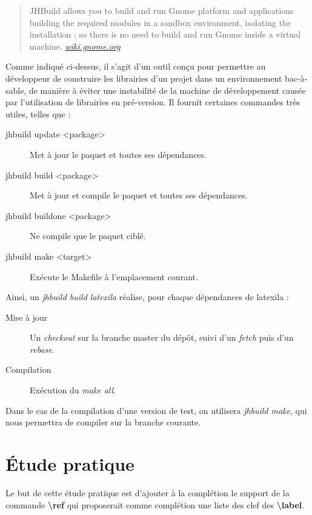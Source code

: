 \documentclass[a4paper,11pt]{report}
\begin{document}
\begin{quote}
JHBuild allows you to build and run Gnome platform and applications building the required modules in a sandbox environment, isolating the installation ; so there is no need to build and run Gnome inside a virtual machine. \textit{\url{wiki.gnome.org}}
\end{quote}

Comme indiqué ci-dessus, il s'agit d'un outil conçu pour permettre au développeur de construire les librairies d'un projet dans un environnement bac-à-sable, de manière à éviter une instabilité de la machine de développement causée par l'utilisation de librairies en pré-version.
Il fournit certaines commandes très utiles, telles que :

\begin{description}
  \item[jhbuild update <package>] Met à jour le paquet et toutes ses dépendances.
  \item[jhbuild build <package>] Met à jour et compile le paquet et toutes ses dépendances.
  \item[jhbuild buildone <package>] Ne compile que le paquet ciblé.
  \item[jhbuild make <target>] Exécute le Makefile à l'emplacement courant.
\end{description}

Ainsi, un \textit{jhbuild build latexila} réalise, pour chaque dépendances de latexila :

\begin{description} 
  \item[Mise à jour] Un \textit{checkout} sur la branche master du dépôt, suivi d'un \textit{fetch} puis d'un \textit{rebase}.
  \item[Compilation] Exécution du \textit{make all}.
\end{description}

Dans le cas de la compilation d'une version de test, on utilisera \textit{jhbuild make}, qui nous permettra de compiler sur la branche courante.

\chapter{Étude pratique} %
\label{cha:etude_pratique}
Le but de cette étude pratique est d'ajouter à la complétion le support de la commande \textbf{\textbackslash{}ref} qui proposerait comme complétion une liste des clef des \textbf{\textbackslash{}label}.
\end{document}
